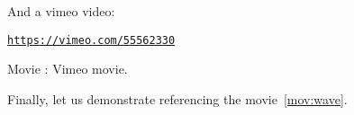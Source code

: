 \documentclass[%
oneside,                 %
final,                   %
10pt]{article}
\newenvironment{doconce:movie}{}{}
\newcounter{doconce:movie:counter}
\begin{document}
And a vimeo video:


\begin{doconce:movie}
\begin{center}\href{{https://vimeo.com/55562330}}{\nolinkurl{https://vimeo.com/55562330}}\end{center}

\begin{center}  %
Movie : Vimeo movie.
\end{center}
\end{doconce:movie}


Finally, let us demonstrate referencing the movie~\ref{mov:wave}.

\end{document}
